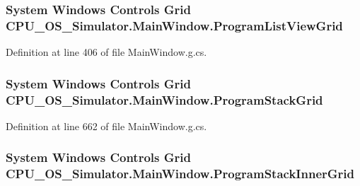 \subsubsection[{Program\+List\+View\+Grid}]{\setlength{\rightskip}{0pt plus 5cm}System Windows Controls Grid C\+P\+U\+\_\+\+O\+S\+\_\+\+Simulator.\+Main\+Window.\+Program\+List\+View\+Grid\hspace{0.3cm}{\ttfamily [package]}}\label{class_c_p_u___o_s___simulator_1_1_main_window_a4e287cef9f0becaebe0777af8de2d8c9}


Definition at line 406 of file Main\+Window.\+g.\+cs.

\hypertarget{class_c_p_u___o_s___simulator_1_1_main_window_a59373e8f8822e4efea670d9fb87a1b32}{}
\subsubsection[{Program\+Stack\+Grid}]{\setlength{\rightskip}{0pt plus 5cm}System Windows Controls Grid C\+P\+U\+\_\+\+O\+S\+\_\+\+Simulator.\+Main\+Window.\+Program\+Stack\+Grid\hspace{0.3cm}{\ttfamily [package]}}\label{class_c_p_u___o_s___simulator_1_1_main_window_a59373e8f8822e4efea670d9fb87a1b32}


Definition at line 662 of file Main\+Window.\+g.\+cs.

\hypertarget{class_c_p_u___o_s___simulator_1_1_main_window_a8c373866c86f6be0e7ef487a5ccb8c3c}{}
\subsubsection[{Program\+Stack\+Inner\+Grid}]{\setlength{\rightskip}{0pt plus 5cm}System Windows Controls Grid C\+P\+U\+\_\+\+O\+S\+\_\+\+Simulator.\+Main\+Window.\+Program\+Stack\+Inner\+Grid\hspace{0.3cm}{\ttfamily [package]}}\label{class_c_p_u___o_s___simulator_1_1_main_window_a8c373866c86f6be0e7ef487a5ccb8c3c}


